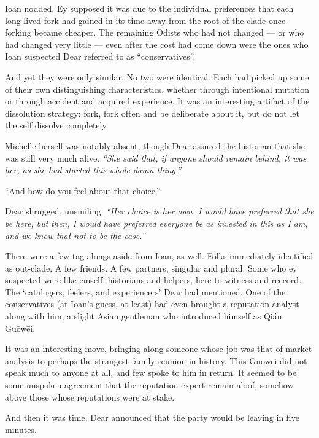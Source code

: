 Ioan nodded. Ey supposed it was due to the individual preferences that each long-lived fork had gained in its time away from the root of the clade once forking became cheaper. The remaining Odists who had not changed — or who had changed very little — even after the cost had come down were the ones who Ioan suspected Dear referred to as ``conservatives''.

And yet they were only similar. No two were identical. Each had picked up some of their own distinguishing characteristics, whether through intentional mutation or through accident and acquired experience. It was an interesting artifact of the dissolution strategy: fork, fork often and be deliberate about it, but do not let the self dissolve completely.

Michelle herself was notably absent, though Dear assured the historian that she was still very much alive. \emph{``She said that, if anyone should remain behind, it was her, as she had started this whole damn thing.''}

``And how do you feel about that choice.''

Dear shrugged, unsmiling. \emph{``Her choice is her own. I would have preferred that she be here, but then, I would have preferred everyone be as invested in this as I am, and we know that not to be the case.''}

There were a few tag-alongs aside from Ioan, as well. Folks immediately identified as out-clade. A few friends. A few partners, singular and plural. Some who ey suspected were like emself: historians and helpers, here to witness and reecord. The `catalogers, feelers, and experiencers' Dear had mentioned. One of the conservatives (at Ioan's guess, at least) had even brought a reputation analyst along with him, a slight Asian gentleman who introduced himself as Qián Guōwēi.

It was an interesting move, bringing along someone whose job was that of market analysis to perhaps the strangest family reunion in history. This Guōwēi did not speak much to anyone at all, and few spoke to him in return. It seemed to be some unspoken agreement that the reputation expert remain aloof, somehow above those whose reputations were at stake.

And then it was time. Dear announced that the party would be leaving in five minutes.
